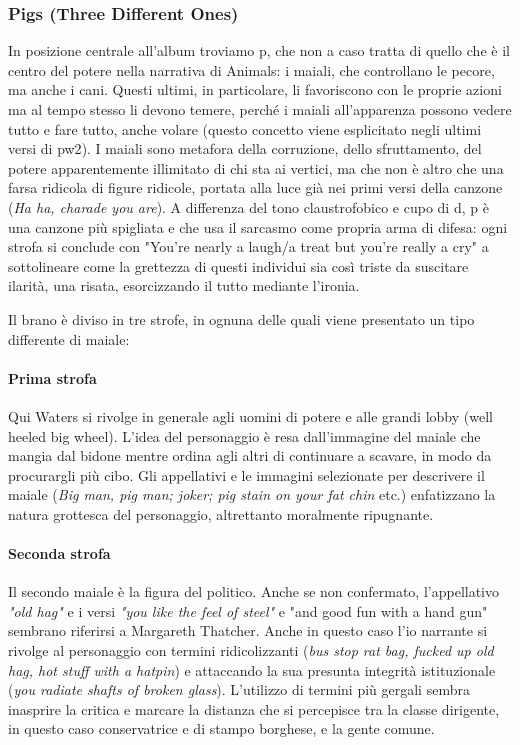 \documentclass[class=book, crop=false, oneside, 12pt]{standalone}
\begin{document}
    \subsubsection{Pigs (Three Different Ones)}
    In posizione centrale all'album troviamo \acrfull{p}, che non a caso tratta di quello che è il centro del potere nella narrativa di Animals: i maiali, che controllano le pecore, ma anche i cani. Questi ultimi, in particolare, li favoriscono con le proprie azioni ma al tempo stesso li devono temere, perché i maiali all'apparenza possono vedere tutto e fare tutto, anche volare (questo concetto viene esplicitato negli ultimi versi di \acrshort{pw2}). I maiali sono metafora della corruzione, dello sfruttamento, del potere apparentemente illimitato di chi sta ai vertici, ma che non è altro che una farsa ridicola di figure ridicole, portata alla luce già nei primi versi della canzone (\emph{Ha ha, charade you are}). A differenza del tono claustrofobico e cupo di \acrshort{d}, \acrshort{p} è una canzone più spigliata e che usa il sarcasmo come propria arma di difesa: ogni strofa si conclude con "You're nearly a laugh/a treat but you're really a cry" a sottolineare come la grettezza di questi individui sia così triste da suscitare ilarità, una risata, esorcizzando il tutto mediante l'ironia. 
    
    Il brano è diviso in tre strofe, in ognuna delle quali viene presentato un tipo differente di maiale:

    \paragraph{Prima strofa} Qui Waters si rivolge in generale agli uomini di potere e alle grandi lobby (well heeled big wheel). L'idea del personaggio è resa dall'immagine del maiale che mangia dal bidone mentre ordina agli altri di continuare a scavare, in modo da procurargli più cibo. Gli appellativi e le immagini selezionate per descrivere il maiale (\emph{Big man, pig man; joker; pig stain on your fat chin} etc.) enfatizzano la natura grottesca del personaggio, altrettanto moralmente ripugnante.

    \paragraph{Seconda strofa} Il secondo maiale è la figura del politico. Anche se non confermato, l'appellativo \emph{"old hag"} e i versi \emph{"you like the feel of steel"} e "and good fun with a hand gun" sembrano riferirsi a Margareth Thatcher. Anche in questo caso l'io narrante si rivolge al personaggio con termini ridicolizzanti (\emph{bus stop rat bag, fucked up old hag, hot stuff with a hatpin}) e attaccando la sua presunta integrità istituzionale (\emph{you radiate shafts of broken glass}). L'utilizzo di termini più gergali sembra inasprire la critica e marcare la distanza che si percepisce tra la classe dirigente, in questo caso conservatrice e di stampo borghese, e la gente comune.
\end{document}
